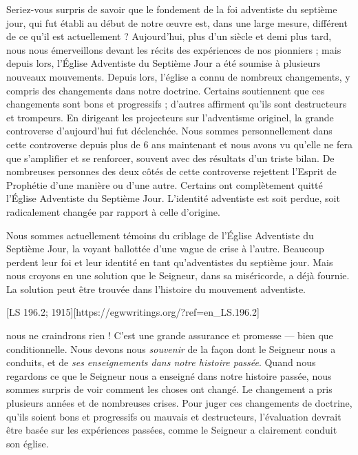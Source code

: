 Seriez-vous surpris de savoir que le fondement de la foi adventiste du septième jour, qui fut établi au début de notre œuvre est, dans une large mesure, différent de ce qu'il est actuellement ? Aujourd'hui, plus d'un siècle et demi plus tard, nous nous émerveillons devant les récits des expériences de nos pionniers ; mais depuis lors, l'Église Adventiste du Septième Jour a été soumise à plusieurs nouveaux mouvements. Depuis lors, l'église a connu de nombreux changements, y compris des changements dans notre doctrine. Certains soutiennent que ces changements sont bons et progressifs ; d'autres affirment qu'ils sont destructeurs et trompeurs. En dirigeant les projecteurs sur l'adventisme originel, la grande controverse d’aujourd’hui fut déclenchée. Nous sommes personnellement dans cette controverse depuis plus de 6 ans maintenant et nous avons vu qu'elle ne fera que s'amplifier et se renforcer, souvent avec des résultats d'un triste bilan. De nombreuses personnes des deux côtés de cette controverse rejettent l'Esprit de Prophétie d'une manière ou d'une autre. Certains ont complètement quitté l'Église Adventiste du Septième Jour. L'identité adventiste est soit perdue, soit radicalement changée par rapport à celle d'origine.

Nous sommes actuellement témoins du criblage de l'Église Adventiste du Septième Jour, la voyant ballottée d'une vague de crise à l'autre. Beaucoup perdent leur foi et leur identité en tant qu'adventistes du septième jour. Mais nous croyons en une solution que le Seigneur, dans sa miséricorde, a déjà fournie. La solution peut être trouvée dans l'histoire du mouvement adventiste.

[LS 196.2; 1915][https://egwwritings.org/?ref=en\_LS.196.2]

nous ne craindrons rien ! C'est une grande assurance et promesse — bien que conditionnelle. Nous devons nous \textit{souvenir} de la façon dont le Seigneur nous a conduits, et de \textit{ses enseignements dans notre histoire passée}. Quand nous regardons ce que le Seigneur nous a enseigné dans notre histoire passée, nous sommes surpris de voir comment les choses ont changé. Le changement a pris plusieurs années et de nombreuses crises. Pour juger ces changements de doctrine, qu'ils soient bons et progressifs ou mauvais et destructeurs, l'évaluation devrait être basée sur les expériences passées, comme le Seigneur a clairement conduit son église.

